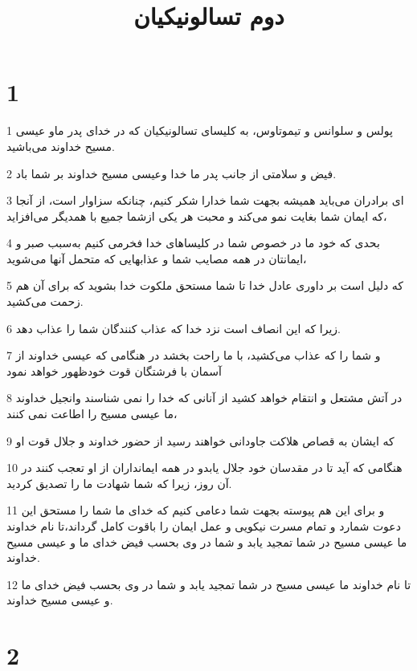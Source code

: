 

\title{دوم تسالونيکيان}


\chapter{1}

\par 1 پولس و سلوانس و تیموتاوس، به کلیسای تسالونیکیان که در خدای پدر ماو عیسی مسیح خداوند می‌باشید.
\par 2 فیض و سلامتی از جانب پدر ما خدا وعیسی مسیح خداوند بر شما باد.
\par 3 ‌ای برادران می‌باید همیشه بجهت شما خدارا شکر کنیم، چنانکه سزاوار است، از آنجا که ایمان شما بغایت نمو می‌کند و محبت هر یکی ازشما جمیع با همدیگر می‌افزاید،
\par 4 بحدی که خود ما در خصوص شما در کلیساهای خدا فخرمی کنیم به‌سبب صبر و ایمانتان در همه مصایب شما و عذابهایی که متحمل آنها می‌شوید،
\par 5 که دلیل است بر داوری عادل خدا تا شما مستحق ملکوت خدا بشوید که برای آن هم زحمت می‌کشید.
\par 6 زیرا که این انصاف است نزد خدا که عذاب کنندگان شما را عذاب دهد.
\par 7 و شما را که عذاب می‌کشید، با ما راحت بخشد در هنگامی که عیسی خداوند از آسمان با فرشتگان قوت خودظهور خواهد نمود
\par 8 در آتش مشتعل و انتقام خواهد کشید از آنانی که خدا را نمی شناسند وانجیل خداوند ما عیسی مسیح را اطاعت نمی کنند،
\par 9 که ایشان به قصاص هلاکت جاودانی خواهند رسید از حضور خداوند و جلال قوت او
\par 10 هنگامی که آید تا در مقدسان خود جلال یابدو در همه ایمانداران از او تعجب کنند در آن روز، زیرا که شما شهادت ما را تصدیق کردید.
\par 11 و برای این هم پیوسته بجهت شما دعامی کنیم که خدای ما شما را مستحق این دعوت شمارد و تمام مسرت نیکویی و عمل ایمان را باقوت کامل گرداند،تا نام خداوند ما عیسی مسیح در شما تمجید یابد و شما در وی بحسب فیض خدای ما و عیسی مسیح خداوند.
\par 12 تا نام خداوند ما عیسی مسیح در شما تمجید یابد و شما در وی بحسب فیض خدای ما و عیسی مسیح خداوند.

\chapter{2}

